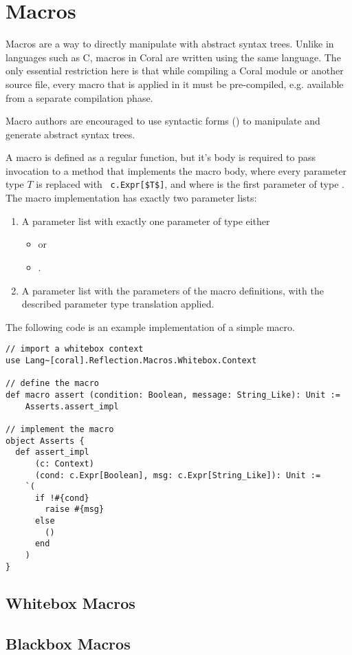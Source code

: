 \section{Macros}
\label{sec:macros}

Macros are a way to directly manipulate with abstract syntax trees. Unlike in languages such as C, macros in Coral are written using the same language. The only essential restriction here is that while compiling a Coral module or another source file, every macro that is applied in it must be pre-compiled, e.g. available from a separate compilation phase. 

Macro authors are encouraged to use syntactic forms () to manipulate and generate abstract syntax trees. 

A macro is defined as a regular function, but it's body is required to pass invocation to a method that implements the macro body, where every parameter type $T$ is replaced with ~\lstinline!c.Expr[$T$]!, and where  is the first parameter of type . The macro implementation has exactly two parameter lists: 
\begin{enumerate}
\item A parameter list with exactly one parameter of type either
\begin{itemize}
\item {} or 
\item {}.
\end{itemize} 
\item A parameter list with the parameters of the macro definitions, with the described parameter type translation applied. 
\end{enumerate}

\example The following code is an example implementation of a simple  macro. 
\begin{lstlisting}[deletekeywords={message}]
// import a whitebox context
use Lang~[coral].Reflection.Macros.Whitebox.Context

// define the macro
def macro assert (condition: Boolean, message: String_Like): Unit := 
    Asserts.assert_impl

// implement the macro
object Asserts {
  def assert_impl 
      (c: Context)
      (cond: c.Expr[Boolean], msg: c.Expr[String_Like]): Unit :=
    `(
      if !#{cond}
        raise #{msg}
      else
        ()
      end
    )
}
\end{lstlisting}





\subsection{Whitebox Macros}

\subsection{Blackbox Macros}





